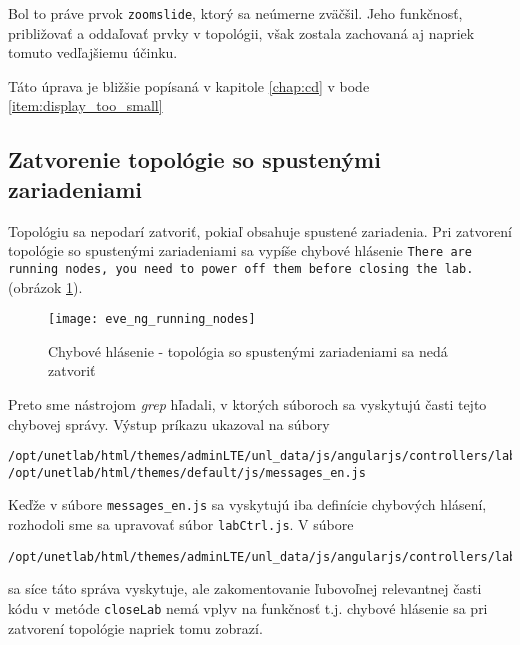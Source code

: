 Bol to práve prvok \texttt{zoomslide}, ktorý sa neúmerne zväčšil. Jeho funkčnosť, približovať a oddaľovať prvky v topológii, však zostala zachovaná aj napriek tomuto vedľajšiemu účinku.

Táto úprava je bližšie popísaná v kapitole \ref{chap:cd} v bode \ref{item:display_too_small}






\subsection{Zatvorenie topológie so spustenými zariadeniami}
\label{chap:zatvorenie_topo_so_spustenymi_zariadeniami}

Topológiu sa nepodarí zatvoriť, pokiaľ obsahuje spustené zariadenia. Pri zatvorení topológie so spustenými zariadeniami sa vypíše chybové hlásenie \texttt{There are running nodes, you need to power off them before closing the lab.} (obrázok \ref{obr:eve_ng_running_nodes}).

\begin{figure}
    \centering
    \texttt{[image: eve\_ng\_running\_nodes]}
    \caption{Chybové hlásenie - topológia so spustenými zariadeniami sa nedá zatvoriť}
    \label{obr:eve_ng_running_nodes}
\end{figure}

Preto sme nástrojom \emph{grep} hľadali, v ktorých súboroch sa vyskytujú časti tejto chybovej správy. Výstup príkazu ukazoval na súbory

\begin{Verbatim}[samepage=true]
/opt/unetlab/html/themes/adminLTE/unl_data/js/angularjs/controllers/lab/labCtrl.js
/opt/unetlab/html/themes/default/js/messages_en.js
\end{Verbatim}

Keďže v súbore \texttt{messages\_en.js} sa vyskytujú iba definície chybových hlásení, rozhodoli sme sa upravovať súbor \texttt{labCtrl.js}. V súbore

\begin{Verbatim}[samepage=true]
/opt/unetlab/html/themes/adminLTE/unl_data/js/angularjs/controllers/lab/labCtrl.js
\end{Verbatim}

sa síce táto správa vyskytuje, ale zakomentovanie ľubovoľnej relevantnej časti kódu v metóde \texttt{closeLab} nemá vplyv na funkčnosť t.j. chybové hlásenie sa pri zatvorení topológie napriek tomu zobrazí.

